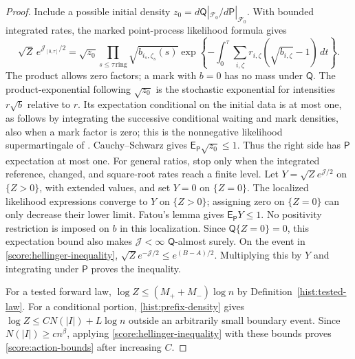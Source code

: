 \begin{proof}
Include a possible initial density $z_0=d\mathsf Q|_{\mathcal F_0}/
d\mathsf P|_{\mathcal F_0}$.  With bounded integrated rates, the marked
point-process likelihood formula \cite[Theorem~5.1]{Jacod1975} gives
\[
 \sqrt Z\,e^{\mathcal J_{[0,\tau]}/2}
 =\sqrt{z_0}\prod_{s\le\tau\,\mathrm{ring}}\sqrt{b_{i_s,\zeta_s}(s)}
   \exp\left\{-\int_0^\tau\sum_{i,\zeta}r_{i,\zeta}(\sqrt{b_{i,\zeta}}-1)\,dt
       \right\}.
\]
The product allows zero factors; a mark with $b=0$ has no mass under
$\mathsf Q$.  The product-exponential following $\sqrt{z_0}$ is the
stochastic exponential for intensities $r\sqrt b$ relative to $r$.
Its expectation conditional on the initial
data is at most one, as follows by integrating the successive conditional
waiting and mark densities, also when a mark factor is zero; this is the
nonnegative likelihood supermartingale of \cite[Proposition~4.3]{Jacod1975}.
Cauchy--Schwarz
gives $\mathsf E_{\mathsf P}\sqrt{z_0}\le1$.  Thus the right side has
$\mathsf P$ expectation at most one.  For general ratios, stop only when
the integrated reference, changed, and square-root rates reach a finite
level.  Let $Y=\sqrt Z e^{\mathcal J/2}$ on $\{Z>0\}$, with extended
values, and set $Y=0$ on $\{Z=0\}$.  The localized likelihood expressions
converge to $Y$ on $\{Z>0\}$; assigning zero on $\{Z=0\}$ can only decrease
their lower limit.  Fatou's lemma gives $\mathsf E_{\mathsf P}Y\le1$.
No positivity restriction is imposed on $b$ in this localization.
Since $\mathsf Q\{Z=0\}=0$, this expectation bound also makes
$\mathcal J<\infty$ $\mathsf Q$-almost surely.  On the event in
\eqref{score:hellinger-inequality},
$\sqrt Z e^{-\mathcal J/2}\le e^{(B-A)/2}$.  Multiplying this by $Y$
and integrating under $\mathsf P$ proves the inequality.

For a tested forward law, $\log Z\le(M_++M_-)\log n$ by
Definition~\ref{hist:tested-law}.  For a conditional portion,
\eqref{hist:prefix-density} gives $\log Z\le CN(|I|)+L\log n$ outside an
arbitrarily small boundary event.  Since $N(|I|)\ge c n^\beta$, applying
\eqref{score:hellinger-inequality} with these bounds proves
\eqref{score:action-bounds} after increasing $C$.


\end{proof}
